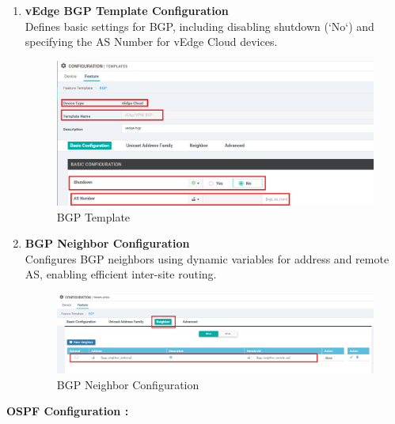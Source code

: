 \documentclass[12pt,english]{report}
\begin{document}
\begin{enumerate}
    \item \textbf{vEdge BGP Template Configuration} \\
    Defines basic settings for BGP, including disabling shutdown (`No`) and specifying the AS Number for vEdge Cloud devices.
\begin{figure}[H]
    \centering
    \includegraphics[width= 1 \textwidth]{chapitre 3/template/3.png}
    \caption{BGP Template}
    \label{BGP Template}
\end{figure}
    \item \textbf{BGP Neighbor Configuration} \\
    Configures BGP neighbors using dynamic variables for address and remote AS, enabling efficient inter-site routing.
\begin{figure}[H]
    \centering
    \includegraphics[width= 1 \textwidth]{chapitre 3/template/3.5.png}
    \caption{BGP Neighbor Configuration}
    \label{BGP Neighbor Configuration}
\end{figure}
\end{enumerate}
\textbf{OSPF Configuration :}
\end{document}
